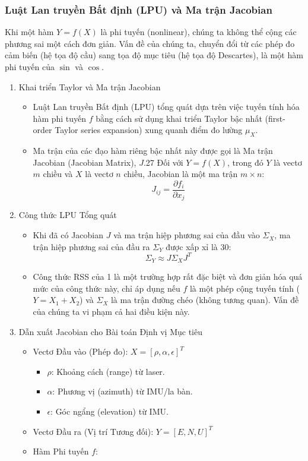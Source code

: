 \subsubsection{Luật Lan truyền Bất định (LPU) và Ma trận Jacobian}
Khi một hàm $Y = f(X)$ là phi tuyến (nonlinear), chúng ta không thể cộng các phương sai một cách đơn giản. Vấn đề của chúng ta, chuyển đổi từ các phép đo cảm biến (hệ tọa độ cầu) sang tọa độ mục tiêu (hệ tọa độ Descartes), là một hàm phi tuyến của $\sin$ và $\cos$.
\begin{enumerate}
    \item Khai triển Taylor và Ma trận Jacobian
    \begin{itemize}
        \item Luật Lan truyền Bất định (LPU) tổng quát dựa trên việc tuyến tính hóa hàm phi tuyến $f$ bằng cách sử dụng khai triển Taylor bậc nhất (first-order Taylor series expansion) xung quanh điểm đo lường $\mu_X$.
        \item Ma trận của các đạo hàm riêng bậc nhất này được gọi là Ma trận Jacobian (Jacobian Matrix), $J$.27 Đối với $Y = f(X)$, trong đó $Y$ là vectơ $m$ chiều và $X$ là vectơ $n$ chiều, Jacobian là một ma trận $m \times n$:
        $$J_{ij} = \frac{\partial f_i}{\partial x_j}$$
    \end{itemize}
    \item Công thức LPU Tổng quát
    \begin{itemize}
        \item Khi đã có Jacobian $J$ và ma trận hiệp phương sai của đầu vào $\Sigma_X$, ma trận hiệp phương sai của đầu ra $\Sigma_Y$ được xấp xỉ là 30:$$\Sigma_Y \approx J \Sigma_X J^T$$
        \item Công thức RSS của 1 là một trường hợp rất đặc biệt và đơn giản hóa quá mức của công thức này, chỉ áp dụng nếu $f$ là một phép cộng tuyến tính ($Y = X_1 + X_2$) và $\Sigma_X$ là ma trận đường chéo (không tương quan). Vấn đề của chúng ta vi phạm cả hai điều kiện này.
    \end{itemize}
    \item Dẫn xuất Jacobian cho Bài toán Định vị Mục tiêu
    \begin{itemize}
        \item Vectơ Đầu vào (Phép đo): $X = [\rho, \alpha, \epsilon]^T$
        \begin{itemize}
            \item $\rho$: Khoảng cách (range) từ laser.
            \item $\alpha$: Phương vị (azimuth) từ IMU/la bàn.
            \item $\epsilon$: Góc ngẩng (elevation) từ IMU.
        \end{itemize}
        \item Vectơ Đầu ra (Vị trí Tương đối): $Y = [E, N, U]^T$
        \item Hàm Phi tuyến $f$:
        

\end{itemize}
\end{enumerate}
